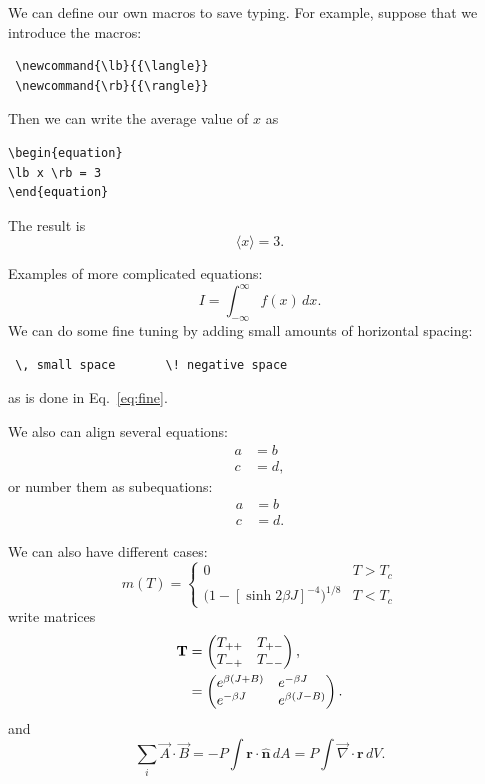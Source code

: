 \documentclass[prb,12pt]{revtex4}
\begin{document}
We can define our own macros to save typing. For example, suppose
that we introduce the macros:
\begin{verbatim}
 \newcommand{\lb}{{\langle}}
 \newcommand{\rb}{{\rangle}}
\end{verbatim}
\newcommand{\lb}{{\langle}}
\newcommand{\rb}{{\rangle}}
Then we can write the average value of $x$ as
\begin{verbatim}
\begin{equation}
\lb x \rb = 3
\end{equation}
\end{verbatim}
The result is
\begin{equation}
\lb x \rb = 3 .
\end{equation}

Examples of more complicated equations:
\begin{equation}
I = \! \int_{-\infty}^\infty f(x)\,dx \label{eq:fine}.
\end{equation}
We can do some fine tuning by adding small amounts of horizontal
spacing:
\begin{verbatim}
 \, small space       \! negative space
\end{verbatim}
as is done in Eq.~\eqref{eq:fine}.

We also can align several equations:
\begin{align}
a & = b \\
c &= d ,
\end{align}
or number them as subequations:
\begin{subequations}
\begin{align}
a & = b \\
c &= d .
\end{align}
\end{subequations}

We can also have different cases:
\begin{equation}
\label{eq:mdiv}
m(T) =
\begin{cases}
0 & \text{$T > T_c$} \\
\bigl(1 - [\sinh 2 \beta J]^{-4} \bigr)^{\! 1/8} & \text{$T < T_c$}
\end{cases}
\end{equation}
write matrices
\begin{align}
\textbf{T} &=
\begin{pmatrix}
T_{++} \hfill & T_{+-} \\
T_{-+} & T_{--} \hfill 
\end{pmatrix} , \nonumber \\
& =
\begin{pmatrix}
e^{\beta (J + B)} \hfill & e^{-\beta J} \hfill \\
e^{-\beta J} \hfill & e^{\beta (J - B)} \hfill
\end{pmatrix}.
\end{align}
and 
\newcommand{\rv}{\textbf{r}}
\begin{equation}
\sum_i \vec A \cdot \vec B = -P\!\int\! \rv \cdot
\hat{\mathbf{n}}\, dA = P\!\int \! {\vec \nabla} \cdot \rv\, dV.
\end{equation}
\end{document}
